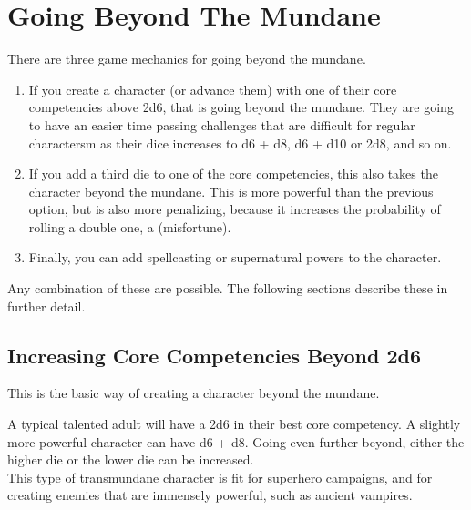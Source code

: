 \documentclass{LegrandOrangeTufteBook}
\newcommand{\term}[1]{\textcolor{colorTerm}{#1}}
\begin{document}
\chapterspaceabove{6.75cm}
\chapterspacebelow{11.25cm}


\chapter*{Going Beyond The Mundane}

There are three game mechanics for going beyond the \term{mundane}.

\begin{enumerate}
    \item If you create a character (or advance them) with one of their \term{core competencies} above 2d6, that is going beyond the mundane. They are going to have an easier time passing challenges that are difficult for regular charactersm as their dice increases to d6 + d8, d6 + d10 or 2d8, and so on.
    \item If you add a third die to one of the \term{core competencies}, this also takes the character beyond the mundane. This is more powerful than the previous option, but is also more penalizing, because it increases the probability of rolling a double one, a \term(misfortune).
    \item Finally, you can add spellcasting or supernatural powers to the character.
\end{enumerate}

Any combination of these are possible. The following sections describe these in further detail.

\section*{Increasing Core Competencies Beyond 2d6}

This is the basic way of creating a character beyond the \term{mundane}.
\marginpar{
    \footnotesize
    
}

A typical talented adult will have a 2d6 in their best \term{core competency}.
A slightly more powerful character can have d6 + d8.
Going even further beyond, either the higher die or the lower die can be increased.\\

This type of \term{transmundane} character is fit for superhero campaigns,
and for creating enemies that are immensely powerful, such as ancient vampires.

\end{document}
